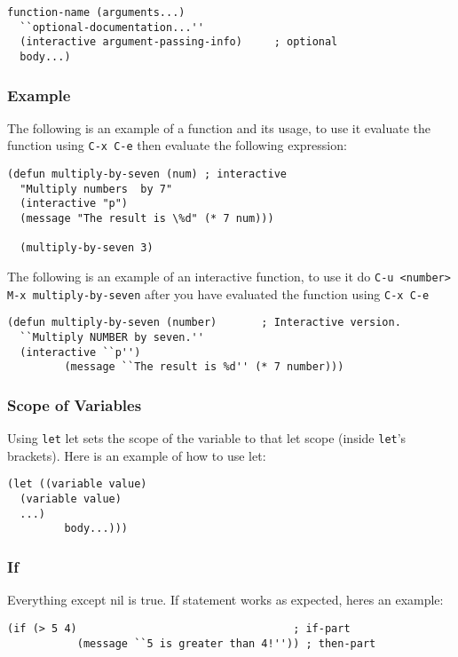 \documentclass[12pt, letterpaper]{article}
\def\code#1{\texttt{#1}}
\begin{document}
\begin{lstlisting}[caption=Function skeleton]
  function-name (arguments...)
  ``optional-documentation...''
  (interactive argument-passing-info)     ; optional
  body...)
\end{lstlisting}

\subsubsection{Example}
The following is an example of a function and its usage, to use it evaluate the function using \code{C-x C-e} then evaluate the following expression:

\begin{lstlisting}[caption= Multiply by seven example]
  (defun multiply-by-seven (num) ; interactive
  "Multiply numbers  by 7"
  (interactive "p")
  (message "The result is \%d" (* 7 num)))

  (multiply-by-seven 3)
\end{lstlisting}

The following is an example of an interactive function, to use it do \code{C-u <number> M-x multiply-by-seven} after you have evaluated the function using \code{C-x C-e}
\begin{lstlisting}[caption= Interactive multiply by seven example]
  (defun multiply-by-seven (number)       ; Interactive version.
  ``Multiply NUMBER by seven.''
  (interactive ``p'')
         (message ``The result is %d'' (* 7 number)))
\end{lstlisting}

\subsubsection{Scope of Variables}
Using \code{let} let sets the scope of the variable to that let scope (inside \code{let}'s brackets). Here is an example of how to use let:

\begin{lstlisting}[caption= Let general usage]
  (let ((variable value)
  (variable value)
  ...)
         body...)))
\end{lstlisting}

\subsubsection{If}
Everything except nil is true. If statement works as expected, heres an example:

\begin{lstlisting}[caption= If statement example with int]
  (if (> 5 4)                                  ; if-part
           (message ``5 is greater than 4!'')) ; then-part
\end{lstlisting}
\end{document}
